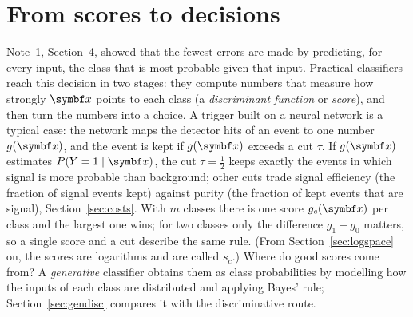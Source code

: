 \documentclass[11pt]{article}
\begin{document}

\section{From scores to decisions}\label{sec:scores}

Note~1, Section~4, showed that the fewest errors are made by predicting, for every input, the class that is most
probable given that input. Practical classifiers reach this decision in two stages: they compute numbers that measure
how strongly $\x$ points to each class (a \emph{discriminant function} or \emph{score}), and then turn the numbers
into a choice. A trigger built on a neural network is a typical case: the network maps the detector hits of an event
to one number $g(\x)$, and the event is kept if $g(\x)$ exceeds a cut $\tau$. If $g(\x)$ estimates
$P(Y = 1 \mid \x)$, the cut $\tau = \tfrac12$ keeps exactly the events in which signal is more probable than
background; other cuts trade signal efficiency (the fraction of signal events kept) against purity (the fraction of
kept events that are signal), Section~\ref{sec:costs}. With $m$ classes there is one score
$g_c(\x)$ per class and the largest one wins; for two classes only the difference $g_1 - g_0$ matters, so a single
score and a cut describe the same rule. (From Section~\ref{sec:logspace} on, the scores are logarithms and are called
$s_c$.) Where do good scores come from? A \emph{generative} classifier
obtains them as class probabilities by modelling how the inputs of each class are distributed and applying Bayes'
rule; Section~\ref{sec:gendisc} compares it with the discriminative route.
\end{document}

